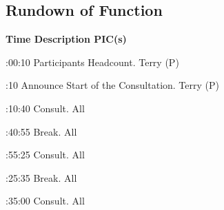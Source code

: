 \pagebreak
\subsection{Rundown of Function}

\setupTABLE[c][1][width=1.25in]
\setupTABLE[c][2][width=3.5in]
\setupTABLE[c][3][width=1.25in]
\bTABLE
\bTABLEhead

\bTR\bTH    \bf{Time}
\eTH\bTH    \bf{Description}
\eTH\bTH    \bf{PIC(s)}
\eTH\eTR

\eTABLEhead
\bTABLEbody

\bTR{}:00:10
\eTD\bTD Participants Headcount.
\eTD\bTD Terry (P)
\eTD\eTR

\bTR{}:10
\eTD\bTD Announce Start of the Consultation.
\eTD\bTD Terry (P)
\eTD\eTR

\bTR{}:10:40
\eTD\bTD Consult.
\eTD\bTD All
\eTD\eTR

\bTR{}:40:55
\eTD\bTD Break.
\eTD\bTD All
\eTD\eTR

\bTR{}:55:25
\eTD\bTD Consult.
\eTD\bTD All
\eTD\eTR

\bTR{}:25:35
\eTD\bTD Break.
\eTD\bTD All
\eTD\eTR

\bTR{}:35:00
\eTD\bTD Consult.
\eTD\bTD All
\eTD\eTR

\eTABLEbody
\eTABLE

\stopsection
\pagebreak
